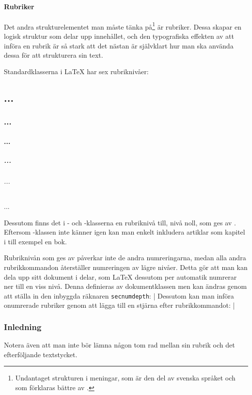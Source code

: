 \documentclass[10pt,../../a4.tex]{subfiles}
\begin{document}
\subsection{Rubriker}
Det andra strukturelementet man måste tänka på\footnote{Undantaget
strukturen i meningar, som är den del av svenska språket och som förklaras
bättre av \textcite{LIU98}.} är rubriker. Dessa skapar en logisk
struktur som delar upp innehållet, och den typografiska effekten av att
införa en rubrik är så stark att det nästan är självklart hur man ska
använda dessa för att strukturera sin text.

Standardklasserna i \LaTeX{} har sex rubriknivåer:
\begin{latexcode}
\part{...}          %
\section{...}       %
\subsection{...}    %
\subsubsection{...} %
\paragraph{...}     %
\subparagraph{...}  %
\end{latexcode}

Dessutom finns det i - och -klasserna en
rubriknivå till, nivå noll, som ges av . 
Eftersom -klassen inte känner igen  kan man
enkelt inkludera artiklar som kapitel i till exempel en bok.

Rubriknivån som ges av  påverkar inte de andra numreringarna,
medan alla andra rubrikkommandon återställer numreringen av lägre nivåer.
Detta gör att man kan dela upp sitt dokument i delar, som
\LaTeX{} dessutom per automatik numrerar ner till en viss nivå. Denna
definieras av dokumentklassen men kan ändras genom att ställa in
den inbyggda räknaren \texttt{secnumdepth}:
\latex|\setcounter{secnumdepth}{2} %
Dessutom kan man införa onumrerade rubriker genom att lägga till en
stjärna efter rubrikkommandot:
\latex|\section*{Inledning} %
Notera även att man inte bör lämna någon tom rad mellan sin rubrik och
det efterföljande textstycket.
\end{document}
